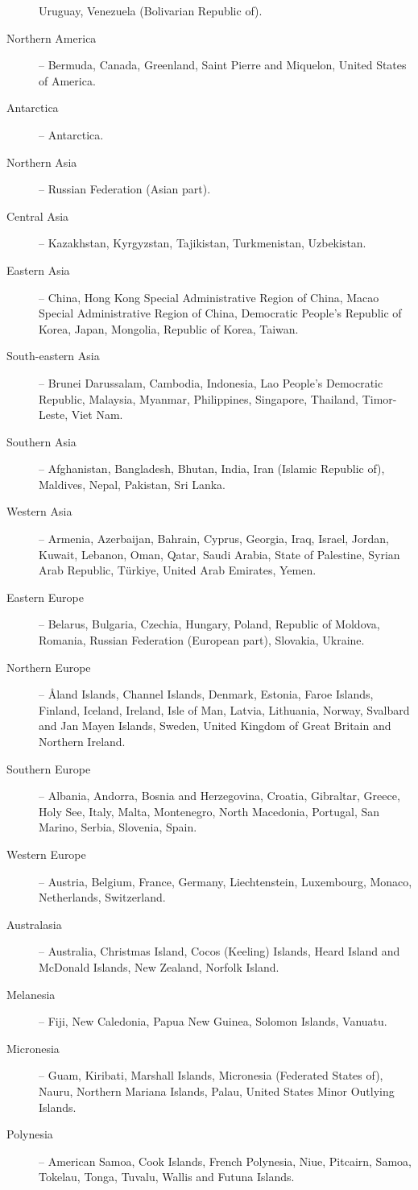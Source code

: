 \begin{description}
          Uruguay, Venezuela (Bolivarian Republic of).
	\item[Northern America] -- Bermuda, Canada, Greenland, Saint Pierre and Miquelon, United States of America.
	\item[Antarctica] -- Antarctica.
	\item[Northern Asia] -- Russian Federation (Asian part).
	\item[Central Asia] -- Kazakhstan, Kyrgyzstan, Tajikistan, Turkmenistan, Uzbekistan.
	\item[Eastern Asia] -- China, Hong Kong Special Administrative Region of China, Macao Special Administrative Region of China,
          Democratic People's Republic of Korea, Japan, Mongolia, Republic of Korea, Taiwan.
	\item[South-eastern Asia] -- Brunei Darussalam, Cambodia, Indonesia, Lao People's Democratic Republic, Malaysia, Myanmar,
          Philippines, Singapore, Thailand, Timor-Leste, Viet Nam.
	\item[Southern Asia] -- Afghanistan, Bangladesh, Bhutan, India, Iran (Islamic Republic of), Maldives, Nepal, Pakistan, Sri Lanka.
	\item[Western Asia] -- Armenia, Azerbaijan, Bahrain, Cyprus, Georgia, Iraq, Israel, Jordan, Kuwait, Lebanon, Oman, Qatar,
          Saudi Arabia, State of Palestine, Syrian Arab Republic, Türkiye, United Arab Emirates, Yemen.
	\item[Eastern Europe] -- Belarus, Bulgaria, Czechia, Hungary, Poland, Republic of Moldova, Romania, Russian Federation (European part), Slovakia, Ukraine.
	\item[Northern Europe] -- Åland Islands, Channel Islands, Denmark, Estonia, Faroe Islands, Finland, Iceland, Ireland, Isle of Man, Latvia, Lithuania,
          Norway, Svalbard and Jan Mayen Islands, Sweden, United Kingdom of Great Britain and Northern Ireland.
	\item[Southern Europe] -- Albania, Andorra, Bosnia and Herzegovina, Croatia, Gibraltar, Greece, Holy See, Italy, Malta, Montenegro, North Macedonia, Portugal, San Marino, Serbia, Slovenia, Spain.
	\item[Western Europe] -- Austria, Belgium, France, Germany, Liechtenstein, Luxembourg, Monaco, Netherlands, Switzerland.
	\item[Australasia] -- Australia, Christmas Island, Cocos (Keeling) Islands, Heard Island and McDonald Islands, New Zealand, Norfolk Island.
	\item[Melanesia] -- Fiji, New Caledonia, Papua New Guinea, Solomon Islands, Vanuatu.
	\item[Micronesia] -- Guam, Kiribati, Marshall Islands, Micronesia (Federated States of), Nauru, Northern Mariana Islands, Palau, United States Minor Outlying Islands.
	\item[Polynesia] -- American Samoa, Cook Islands, French Polynesia, Niue, Pitcairn, Samoa, Tokelau, Tonga, Tuvalu, Wallis and Futuna Islands.
\end{description}

